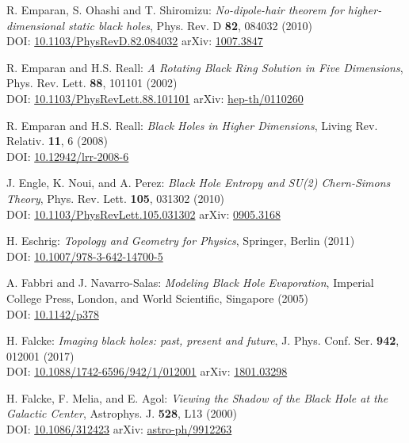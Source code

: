 \begin{thebibliography}{123}
R. Emparan, S. Ohashi and T. Shiromizu:
{\em No-dipole-hair theorem for higher-dimensional static black holes},
Phys. Rev. D {\bf 82}, 084032 (2010)\\
DOI: \href{https://doi.org/10.1103/PhysRevD.82.084032}{10.1103/PhysRevD.82.084032}\hfill
arXiv: \href{https://arxiv.org/abs/1007.3847}{1007.3847}

R. Emparan and H.S. Reall:
{\em A Rotating Black Ring Solution in Five Dimensions},
Phys. Rev. Lett. {\bf 88}, 101101 (2002)\\
DOI: \href{https://doi.org/10.1103/PhysRevLett.88.101101}{10.1103/PhysRevLett.88.101101}\hfill
arXiv: \href{https://arxiv.org/abs/hep-th/0110260}{hep-th/0110260}

R. Emparan and H.S. Reall:
{\em Black Holes in Higher Dimensions},
Living Rev. Relativ. {\bf 11}, 6 (2008)\\
DOI: \href{https://doi.org/10.12942/lrr-2008-6}{10.12942/lrr-2008-6}

J. Engle, K. Noui, and A. Perez:
{\em Black Hole Entropy and SU(2) Chern-Simons Theory},
Phys. Rev. Lett. {\bf 105}, 031302 (2010)\\
DOI: \href{https://doi.org/10.1103/PhysRevLett.105.031302}{10.1103/PhysRevLett.105.031302}\hfill
arXiv: \href{https://arxiv.org/abs/0905.3168}{0905.3168}

H. Eschrig: {\em Topology and Geometry for Physics},
Springer, Berlin (2011)\\
DOI: \href{https://doi.org/10.1007/978-3-642-14700-5}{10.1007/978-3-642-14700-5}

A. Fabbri and J. Navarro-Salas:
{\em Modeling Black Hole Evaporation},
Imperial College Press, London, and World Scientific, Singapore (2005)\\
DOI: \href{https://doi.org/10.1142/p378}{10.1142/p378}

H. Falcke:
{\em Imaging black holes: past, present and future},
J. Phys. Conf. Ser. {\bf 942}, 012001 (2017)\\
DOI: \href{https://doi.org/10.1088/1742-6596/942/1/012001}{10.1088/1742-6596/942/1/012001}\hfill
arXiv: \href{https://arxiv.org/abs/1801.03298}{1801.03298}

H. Falcke, F. Melia, and E. Agol:
{\em Viewing the Shadow of the Black Hole at the Galactic Center},
Astrophys. J. {\bf 528}, L13 (2000)\\
DOI: \href{https://doi.org/10.1086/312423}{10.1086/312423}\hfill
arXiv: \href{https://arxiv.org/abs/astro-ph/9912263}{astro-ph/9912263}


\end{thebibliography}
